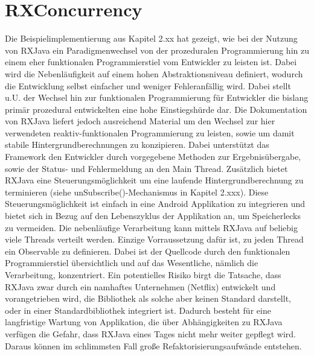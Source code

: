 \documentclass[12pt,oneside,a4paper,bibtotoc,liststotoc]{scrreprt}
\begin{document}
\section{RXConcurrency}
Die Beispielimplementierung aus Kapitel 2.xx hat gezeigt, wie bei der Nutzung von RXJava ein Paradigmenwechsel von der prozeduralen Programmierung hin zu einem eher funktionalen Programmierstiel vom Entwickler zu leisten ist. Dabei wird die Nebenläufigkeit auf einem hohen Abstraktionsniveau definiert, wodurch die Entwicklung selbst einfacher und weniger Fehleranfällig wird. Dabei stellt u.U. der Wechsel hin zur funktionalen Programmierung für Entwickler die bislang primär prozedural entwickelten eine hohe Einstiegshürde dar. Die Dokumentation von RXJava liefert jedoch ausreichend Material um den Wechsel zur hier verwendeten reaktiv-funktionalen Programmierung zu leisten, sowie um damit stabile Hintergrundberechnungen zu konzipieren. Dabei unterstützt das Framework den Entwickler durch vorgegebene Methoden zur Ergebnisübergabe, sowie der Status- und Fehlermeldung an den Main Thread. Zusätzlich bietet RXJava eine Steuerungsmöglichkeit um eine laufende Hintergrundberechnung zu terminieren (siehe unSubscribe()-Mechanismus in Kapitel 2.xxx). Diese Steuerungsmöglichkeit ist einfach in eine Android Applikation zu integrieren und bietet sich in Bezug auf den Lebenszyklus der Applikation an, um Speicherlecks zu vermeiden. Die nebenläufige Verarbeitung kann mittels RXJava auf beliebig viele Threads verteilt werden. Einzige Vorraussetzung dafür ist, zu jeden Thread ein Observable zu definieren. Dabei ist der Quellcode durch den funktionalen Programmierstiel übersichtlich und auf das Wesentliche, nämlich die Verarbeitung, konzentriert.\newline
Ein potentielles Risiko birgt die Tatsache, dass RXJava zwar durch ein namhaftes Unternehmen (Netflix) entwickelt und vorangetrieben wird, die Bibliothek als solche aber keinen Standard darstellt, oder in einer Standardbibliothek integriert ist. Dadurch besteht für eine langfristige Wartung von Applikation, die über Abhängigkeiten zu RXJava verfügen die Gefahr, dass RXJava eines Tages nicht mehr weiter gepflegt wird. Daraus können im schlimmsten Fall große Refaktorisierungsaufwände entstehen.
\end{document}
